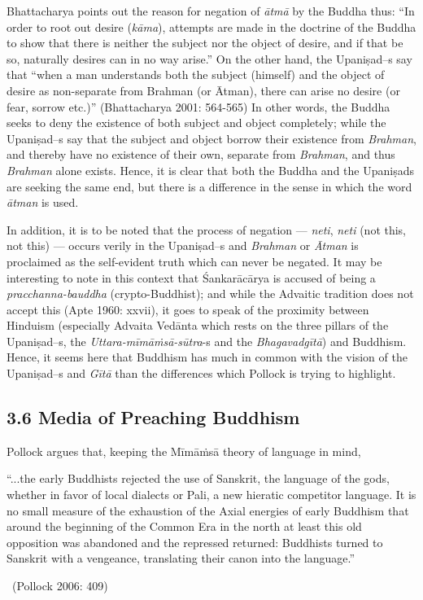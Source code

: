 Bhattacharya points out the reason for negation of \textit{ātmā} by the Buddha thus: “In order to root out desire (\textit{kāma}), attempts are made in the doctrine of the Buddha to show that there is neither the subject nor the object of desire, and if that be so, naturally desires can in no way arise.” On the other hand, the Upaniṣad--s say that “when a man understands both the subject (himself) and the object of desire as non-separate from Brahman (or Ātman), there can arise no desire (or fear, sorrow etc.)” (Bhattacharya 2001: 564-565) In other words, the Buddha seeks to deny the existence of both subject and object completely; while the Upaniṣad--s say that the subject and object borrow their existence from \textit{Brahman}, and thereby have no existence of their own, separate from \textit{Brahman}, and thus \textit{Brahman} alone exists. Hence, it is clear that both the Buddha and the Upaniṣads are seeking the same end, but there is a difference in the sense in which the word \textit{ātman} is used.

In addition, it is to be noted that the process of negation — \textit{neti}, \textit{neti} (not this, not this) — occurs verily in the Upaniṣad--s and \textit{Brahman} or \textit{Ātman} is proclaimed as the self-evident truth which can never be negated. It may be interesting to note in this context that Śankarācārya is accused of being a \textit{pracchanna-bauddha }(crypto-Buddhist); and while the Advaitic tradition does not accept this (Apte 1960: xxvii), it goes to speak of the proximity between Hinduism (especially Advaita Vedānta which rests on the three pillars of the Upaniṣad--s, the \textit{Uttara-mīmāṁsā-sūtra}-s and the \textit{Bhagavadgītā}) and Buddhism. Hence, it seems here that Buddhism has much in common with the vision of the Upaniṣad--s and \textit{Gītā} than the differences which Pollock is trying to highlight.

\newpage

\subsection*{3.6 Media of Preaching Buddhism}

Pollock argues that, keeping the Mīmāṁsā theory of language in mind,

\begin{myquote}
“...the early Buddhists rejected the use of Sanskrit, the language of the gods, whether in favor of local dialects or Pali, a new hieratic competitor language. It is no small measure of the exhaustion of the Axial energies of early Buddhism that around the beginning of the Common Era in the north at least this old opposition was abandoned and the repressed returned: Buddhists turned to Sanskrit with a vengeance, translating their canon into the language.” 

~\hfill (Pollock 2006: 409)
\end{myquote}

